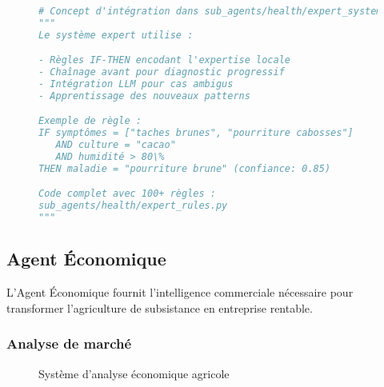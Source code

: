 \begin{figure}[h]
\centering
\begin{lstlisting}[language=Python, caption=Intégration système expert (principe)]
# Concept d'intégration dans sub_agents/health/expert_system.py
"""
Le système expert utilise :

- Règles IF-THEN encodant l'expertise locale
- Chaînage avant pour diagnostic progressif
- Intégration LLM pour cas ambigus
- Apprentissage des nouveaux patterns

Exemple de règle :
IF symptômes = ["taches brunes", "pourriture cabosses"]
   AND culture = "cacao"
   AND humidité > 80\%
THEN maladie = "pourriture brune" (confiance: 0.85)

Code complet avec 100+ règles :
sub_agents/health/expert_rules.py
"""
\end{lstlisting}
\end{figure}

\subsection{Agent Économique}

L'Agent Économique fournit l'intelligence commerciale nécessaire pour transformer l'agriculture de subsistance en entreprise rentable.

\subsubsection{Analyse de marché}

\begin{figure}[h]
\centering
{}
\caption{Système d'analyse économique agricole}
\end{figure}

